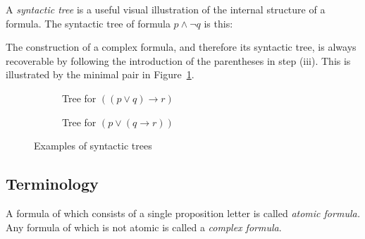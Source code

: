 \documentclass[nobib,nofonts]{tufte-handout}
\newcommand{\proplog}{\acro{PropLog}}
\begin{document}
A \emph{syntactic tree} is a useful visual illustration of the internal structure of a formula.
The syntactic tree of formula $p \wedge \neg q$ is this:

\begin{center}
\end{center}

The construction of a complex formula, and therefore its syntactic tree, is always recoverable by following the introduction of the parentheses in step (iii).
This is illustrated by the minimal pair in Figure~\ref{fig:syntactic-trees}.

\begin{figure}
  \centering

  \begin{subfigure}[b]{0.45\textwidth}
    \caption{Tree for $((p \vee q) \rightarrow r)$}
  \end{subfigure}
  \hfill
  \begin{subfigure}[b]{0.45\textwidth}
    \caption{Tree for $(p \vee (q \rightarrow r))$}
  \end{subfigure}

  \caption{Examples of syntactic trees}
  \label{fig:syntactic-trees}
\end{figure}

\subsection{Terminology}

A formula of \proplog which consists of a single proposition letter is called \emph{atomic formula.}
Any formula of \proplog which is not atomic is called a \emph{complex formula}.
\end{document}

